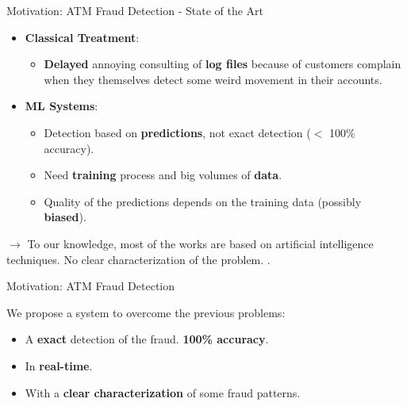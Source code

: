 \begin{frame}{Motivation: ATM Fraud Detection - State of the Art}
    \begin{itemize}
        \item {} \textbf{Classical Treatment}:
        \vspace{0.5em}
        \begin{itemize}
            \item[\textcolor{red}{\ding{55}}] \textbf{Delayed} annoying consulting of \textbf{log files} because of customers complain when they themselves detect some weird movement in their accounts.
        \end{itemize}
        \vspace{0.4em}
        \item {} \textbf{ML Systems}:
        \vspace{0.5em}
        \begin{itemize}
            \item[\textcolor{red}{\ding{55}}] Detection based on \textbf{predictions}, not exact detection ($<$ 100\% accuracy).
            \vspace{0.3em}
            \item[\textcolor{red}{\ding{55}}] Need \textbf{training} process and big volumes of \textbf{data}.
            \vspace{0.3em}
            \item[\textcolor{red}{\ding{55}}] Quality of the predictions depends on the training data (possibly \textbf{biased}).
        \end{itemize}
    \end{itemize}
    \vspace{0.5em}
    $\rightarrow$ To our knowledge, most of the works are based on artificial intelligence techniques. No clear characterization of the problem. \cite{Rahman2019}.\\
\end{frame}

\begin{frame}{Motivation: ATM Fraud Detection}

We propose a system to overcome the previous problems:
\vspace{1em}
\begin{itemize}
    \item[\textcolor{green}{\ding{51}}] A \textbf{exact} detection of the fraud. \textbf{100\% accuracy}.
    \vspace{1em}
    \item[\textcolor{green}{\ding{51}}] In \textbf{real-time}.
    \vspace{1em}
    \item[\textcolor{green}{\ding{51}}] With a \textbf{clear characterization} of some fraud patterns.
\end{itemize}

\end{frame}

